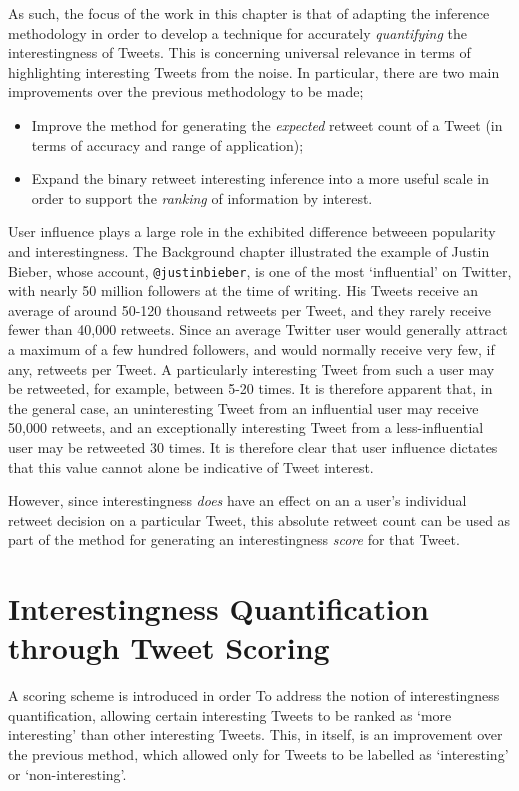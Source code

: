 As such, the focus of the work in this chapter is that of adapting the inference methodology in order to develop a technique for accurately \textit{quantifying} the interestingness of Tweets. This is concerning universal relevance in terms of highlighting interesting Tweets from the noise. In particular, there are two main improvements over the previous methodology to be made;
\begin{itemize}
    \item Improve the method for generating the \textit{expected} retweet count of a Tweet (in terms of accuracy and range of application);
    \item Expand the binary retweet interesting inference into a more useful scale in order to support the \textit{ranking} of information by interest.
\end{itemize}

User influence plays a large role in the exhibited difference betweeen popularity and interestingness. The Background chapter illustrated the example of Justin Bieber, whose account, \texttt{@justinbieber}, is one of the most `influential' on Twitter, with nearly 50 million followers at the time of writing. His Tweets receive an average of around 50-120 thousand retweets per Tweet, and they rarely receive fewer than 40,000 retweets. Since an average Twitter user would generally attract a maximum of a few hundred followers, and would normally receive very few, if any, retweets per Tweet. A particularly interesting Tweet from such a user may be retweeted, for example, between 5-20 times. It is therefore apparent that, in the general case, an uninteresting Tweet from an influential user may receive 50,000 retweets, and an exceptionally interesting Tweet from a less-influential user may be retweeted 30 times. It is therefore clear that user influence dictates that this value cannot alone be indicative of Tweet interest.

However, since interestingness \textit{does} have an effect on an a user's individual retweet decision on a particular Tweet, this absolute retweet count can be used as part of the method for generating an interestingness \textit{score} for that Tweet.


\section{Interestingness Quantification through Tweet Scoring}
A scoring scheme is introduced in order To address the notion of interestingness quantification, allowing certain interesting Tweets to be ranked as `more interesting' than other interesting Tweets. This, in itself, is an improvement over the previous method, which allowed only for Tweets to be labelled as `interesting' or `non-interesting'.

